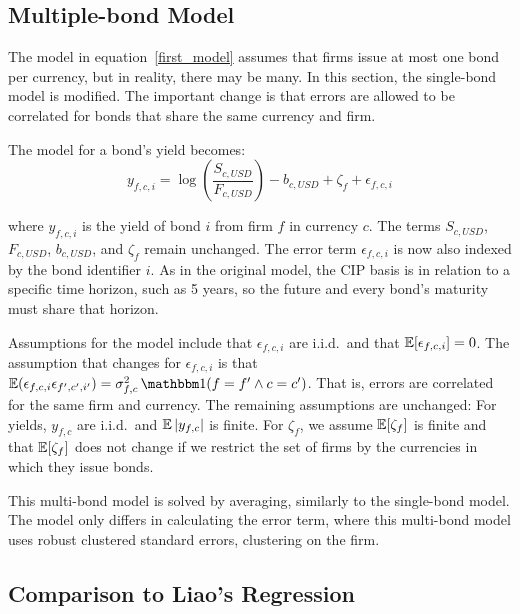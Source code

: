 \subsection{Multiple-bond Model}

The model in equation~\ref{first_model} assumes that firms issue at most one bond per currency, but in reality, there may be many.  In this section, the single-bond model is modified.  The important change is that errors are allowed to be correlated for bonds that share the same currency and firm.  


The model for a bond's yield becomes:
\begin{equation}
  \label{second_model}
 y_{f,c,i} = \log\left(\frac{S_{c,USD}}{F_{c,USD}}\right) - b_{c,USD} + \zeta_{f} + \epsilon_{f,c,i} 
\end{equation}

\noindent where $y_{f,c,i}$ is the yield of bond $i$ from firm $f$ in currency $c$.  The terms $S_{c,USD}$, $F_{c,USD}$, $b_{c,USD}$, and $\zeta_{f}$ remain unchanged.  The error term $\epsilon_{f,c,i}$ is now also indexed by the bond identifier $i$.   As in the original model, the CIP basis is in relation to a specific time horizon, such as 5 years, so the future and every bond's maturity must share that horizon.

Assumptions for the model include that $\epsilon_{f,c,i}$ are i.i.d.\ and that $\operatorname{\mathbb{E}}[\epsilon_{f,c,i}] = 0$.  The assumption that changes for $\epsilon_{f,c,i}$ is that $\E(\epsilon_{f,c,i}\epsilon_{f',c',i'}) = \sigma_{f,c}^2\ind(f=f' \land c=c')$.  That is, errors are correlated for the same firm and currency.  The remaining assumptions are unchanged:  For yields, $y_{f,c}$ are i.i.d.\ and $\operatorname{\mathbb{E}}|y_{f,c}|$ is finite.  For $\zeta_f$, we assume $\operatorname{\mathbb{E}}[\zeta_f]$ is finite and that $\operatorname{\mathbb{E}}[\zeta_f]$ does not change if we restrict the set of firms by the currencies in which they issue bonds.  

This multi-bond model is solved by averaging, similarly to the single-bond model.  The model only differs in calculating the error term, where this multi-bond model uses robust clustered standard errors, clustering on the firm.



\subsection{Comparison to Liao's Regression}

